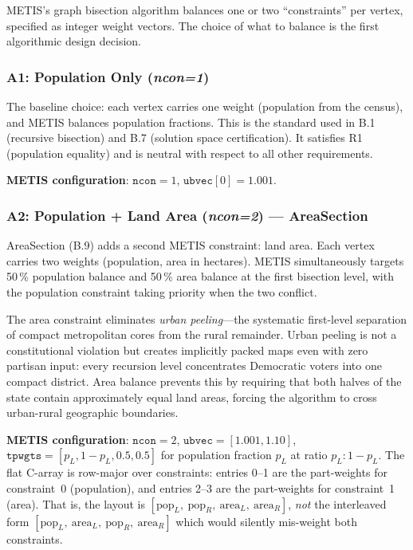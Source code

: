 METIS's graph bisection algorithm balances one or two ``constraints'' per vertex,
specified as integer weight vectors.
The choice of what to balance is the first algorithmic design decision.

\subsubsection*{A1: Population Only (\textit{ncon=1})}

The baseline choice: each vertex carries one weight (population from the census),
and METIS balances population fractions.
This is the standard used in B.1 (recursive bisection) and B.7 (solution space
certification).
It satisfies R1 (population equality) and is neutral with respect to all other
requirements.

\textbf{METIS configuration}: $\mathtt{ncon}=1$, $\mathtt{ubvec}[0]=1.001$.

\subsubsection*{A2: Population + Land Area (\textit{ncon=2}) --- AreaSection}

AreaSection (B.9) adds a second METIS constraint: land area.
Each vertex carries two weights (population, area in hectares).
METIS simultaneously targets 50\,\% population balance and 50\,\% area balance
at the first bisection level, with the population constraint taking priority
when the two conflict.

The area constraint eliminates \emph{urban peeling}---the systematic first-level
separation of compact metropolitan cores from the rural remainder.
Urban peeling is not a constitutional violation but creates implicitly packed
maps even with zero partisan input: every recursion level concentrates Democratic
voters into one compact district.
Area balance prevents this by requiring that both halves of the state contain
approximately equal land areas, forcing the algorithm to cross urban-rural
geographic boundaries.

\textbf{METIS configuration}: $\mathtt{ncon}=2$,
$\mathtt{ubvec}=[1.001, 1.10]$,
$\mathtt{tpwgts}=[p_L, 1-p_L, 0.5, 0.5]$ for population fraction $p_L$ at ratio $p_L:1-p_L$.
The flat C-array is row-major over constraints: entries 0--1 are the part-weights for
constraint~0 (population), and entries 2--3 are the part-weights for constraint~1 (area).
That is, the layout is $[\text{pop}_L,\ \text{pop}_R,\ \text{area}_L,\ \text{area}_R]$,
\emph{not} the interleaved form $[\text{pop}_L,\ \text{area}_L,\ \text{pop}_R,\ \text{area}_R]$
which would silently mis-weight both constraints.


